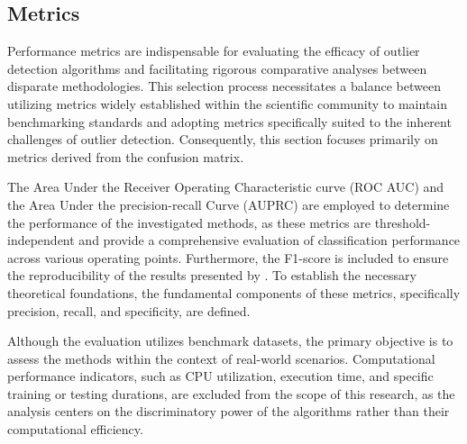 \subsection{Metrics}\label{sec:metrics}
Performance metrics are indispensable for evaluating the efficacy of outlier detection algorithms and facilitating rigorous comparative analyses between disparate methodologies. 
This selection process necessitates a balance between utilizing metrics widely established within the scientific community to maintain benchmarking standards and adopting metrics specifically suited to the inherent challenges of outlier detection. 
Consequently, this section focuses primarily on metrics derived from the confusion matrix. 


The Area Under the Receiver Operating Characteristic curve (ROC AUC) and the Area Under the precision-recall Curve (AUPRC) are employed to determine the performance of the investigated methods, as these metrics are threshold-independent and provide a comprehensive evaluation of classification performance across various operating points. 
Furthermore, the F1-score is included to ensure the reproducibility of the results presented by \cite{shenkar2022anomaly}. 
To establish the necessary theoretical foundations, the fundamental components of these metrics, specifically precision, recall, and specificity, are defined. 


Although the evaluation utilizes benchmark datasets, the primary objective is to assess the methods within the context of real-world scenarios. 
Computational performance indicators, such as CPU utilization, execution time, and specific training or testing durations, are excluded from the scope of this research, as the analysis centers on the discriminatory power of the algorithms rather than their computational efficiency.


